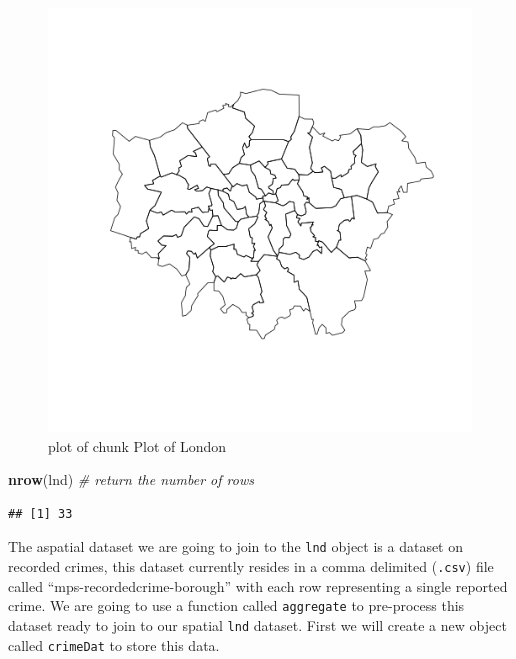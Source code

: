 \documentclass[]{article}
\newenvironment{Shaded}{}{}
\newcommand{\KeywordTok}[1]{\textcolor[rgb]{0.00,0.44,0.13}{\textbf{{#1}}}}
\newcommand{\CommentTok}[1]{\textcolor[rgb]{0.38,0.63,0.69}{\textit{{#1}}}}
\newcommand{\NormalTok}[1]{{#1}}
\begin{document}
\begin{figure}[htbp]
\centering
\includegraphics{figure/Plot_of_London.png}
\caption{plot of chunk Plot of London}
\end{figure}

\begin{Shaded}
\begin{Highlighting}[]
\KeywordTok{nrow}\NormalTok{(lnd)  }\CommentTok{# return the number of rows}
\end{Highlighting}
\end{Shaded}

\begin{verbatim}
## [1] 33
\end{verbatim}

The aspatial dataset we are going to join to the \texttt{lnd} object is
a dataset on recorded crimes, this dataset currently resides in a comma
delimited (\texttt{.csv}) file called ``mps-recordedcrime-borough'' with
each row representing a single reported crime. We are going to use a
function called \texttt{aggregate} to pre-process this dataset ready to
join to our spatial \texttt{lnd} dataset. First we will create a new
object called \texttt{crimeDat} to store this data.
\end{document}
